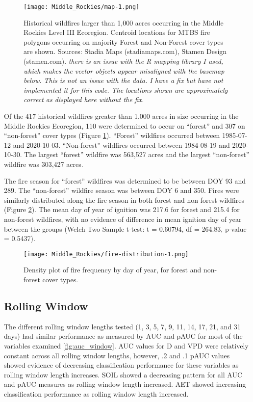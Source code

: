 \documentclass[11pt]{article}
\begin{document}
\begin{figure}[ht]
  \texttt{[image: Middle\_Rockies/map-1.png]}
  \caption{Historical wildfires larger than 1,000 acres occurring in the Middle Rockies Level III Ecoregion.  Centroid locations for MTBS fire polygons occurring on majority Forest and Non-Forest cover types are shown.  Sources: Stadia Maps (stadiamaps.com), Stamen Design (stamen.com). \textit{there is an issue with the R mapping library I used, which makes the vector objects appear misaligned with the basemap below.  This is not an issue with the data. I have a fix but have not implemented it for this code.  The locations shown are approximately correct as displayed here without the fix.}}
  \label{fig:map}
\end{figure}

Of the 417 historical wildfires greater than 1,000 acres in size occurring in the Middle Rockies Ecoregion, 110 were determined to occur on ``forest'' and 307 on ``non-forest'' cover types (Figure \ref{fig:map}).  ``Forest'' wildfires occurred between 1985-07-12 and 2020-10-03.  ``Non-forest'' wildfires occurred between 1984-08-19 and 2020-10-30.  The largest ``forest'' wildfire was 563,527 acres and the largest ``non-forest'' wildfire was 303,427 acres.

The fire season for ``forest'' wildfires was determined to be between DOY 93 and 289.  The ``non-forest'' wildfire season was between DOY 6 and 350.  Fires were similarly distributed along the fire season in both forest and non-forest wildfires (Figure \ref{fig:fire-dens}). The mean day of year of ignition was 217.6 for forest and 215.4 for non-forest wildfires, with no evidence of difference in mean ignition day of year between the groups (Welch Two Sample t-test: t = 0.60794, df = 264.83, p-value = 0.5437).

\begin{figure}[ht]
  \texttt{[image: Middle\_Rockies/fire-distribution-1.png]}
  \caption{Density plot of fire frequency by day of year, for forest and non-forest cover types.}
  \label{fig:fire-dens}
\end{figure}


\subsection{Rolling Window}
The different rolling window lengths tested (1, 3, 5, 7, 9, 11, 14, 17, 21,  and 31 days) had similar performance as measured by AUC and pAUC for most of the variables examined \ref{fig:auc_window}. AUC values for D and VPD were relatively constant across all rolling window lengths, however, .2 and .1 pAUC values showed evidence of decreasing classification performance for these variables as rolling window length increases.  SOIL showed a decreasing pattern for all AUC and pAUC measures as rolling window length increased.  AET showed increasing classification performance as rolling window length increased.  
\end{document}
